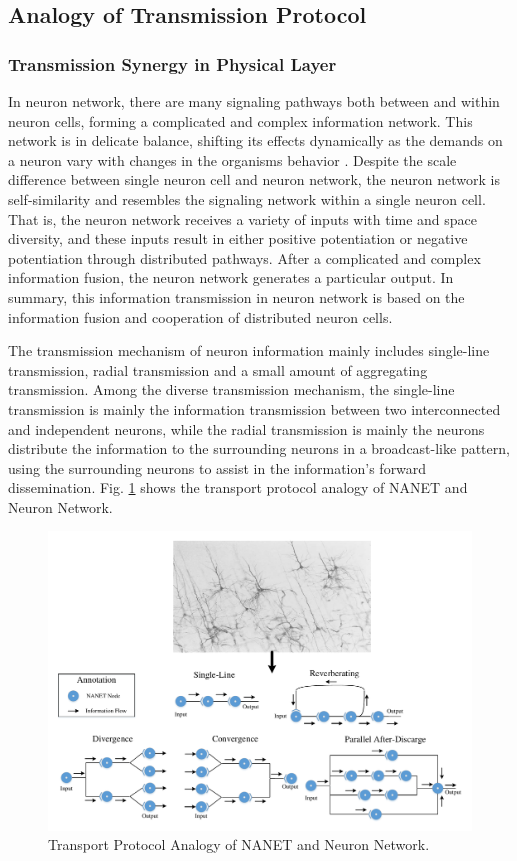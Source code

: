 \documentclass[journal,comsoc]{IEEEtran}
\begin{document}
	
	\subsection{Analogy of Transmission Protocol}
	
	\subsubsection{Transmission Synergy in Physical Layer}
	In neuron network, there are many signaling pathways both between and within neuron cells, forming a complicated and complex information network. 
	This network is in delicate balance, shifting its effects dynamically as the demands on a neuron vary with changes in the organisms behavior \cite{bear2007neuroscience} .
	Despite the scale difference between single neuron cell and neuron network, the neuron network is self-similarity and resembles the signaling network within a single neuron cell. 
	That is, the neuron network receives a variety of inputs with time and space diversity, and these inputs result in either positive potentiation or negative potentiation through distributed pathways. 
	After a complicated and complex information fusion, the neuron network generates a particular output. 
	In summary, this information transmission in neuron network is based on the information fusion and cooperation of distributed neuron cells.
	
	The transmission mechanism of neuron information mainly includes single-line transmission, radial transmission and a small amount of aggregating transmission.
	Among the diverse transmission mechanism, the single-line transmission is mainly the information transmission between two interconnected and independent neurons, while the radial transmission is mainly the neurons distribute the information to the surrounding neurons in a broadcast-like pattern, using the surrounding neurons to assist in the information's forward dissemination.
	Fig. \ref{fig: transport_pro} shows the transport protocol analogy of NANET and Neuron Network.
	\begin{figure}[htbp]
		\centering
		\includegraphics[width=0.9\linewidth]{figures/tran_protocol.pdf}
		\caption{Transport Protocol Analogy of NANET and Neuron Network.}	
		\label{fig: transport_pro}
	\end{figure}
	
\end{document}

